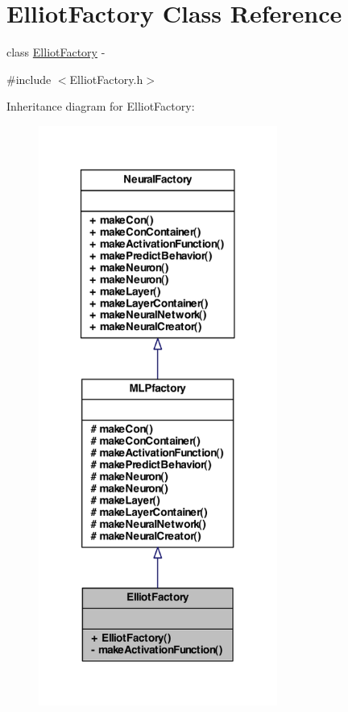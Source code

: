 \hypertarget{class_elliot_factory}{
\section{ElliotFactory Class Reference}
\label{class_elliot_factory}
}


class \hyperlink{class_elliot_factory}{ElliotFactory} -\/  




{\ttfamily \#include $<$ElliotFactory.h$>$}



Inheritance diagram for ElliotFactory:\nopagebreak
\begin{figure}[H]
\begin{center}
\leavevmode
\includegraphics[width=222pt]{class_elliot_factory__inherit__graph}
\end{center}
\end{figure}



